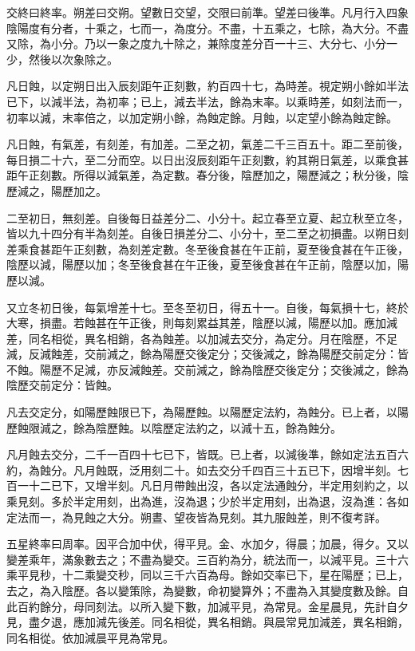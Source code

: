 \begin{pinyinscope}
 交終曰終率。朔差曰交朔。望數日交望，交限曰前準。望差曰後準。凡月行入四象陰陽度有分者，十乘之，七而一，為度分。不盡，十五乘之，七除，為大分。不盡又除，為小分。乃以一象之度九十除之，兼除度差分百一十三、大分七、小分一少，然後以次象除之。



 凡日蝕，以定朔日出入辰刻距午正刻數，約百四十七，為時差。視定朔小餘如半法已下，以減半法，為初率；已上，減去半法，餘為末率。以乘時差，如刻法而一，初率以減，末率倍之，以加定朔小餘，為蝕定餘。月蝕，以定望小餘為蝕定餘。



 凡日蝕，有氣差，有刻差，有加差。二至之初，氣差二千三百五十。距二至前後，每日損二十六，至二分而空。以日出沒辰刻距午正刻數，約其朔日氣差，以乘食甚距午正刻數。所得以減氣差，為定數。春分後，陰歷加之，陽歷減之；秋分後，陰歷減之，陽歷加之。



 二至初日，無刻差。自後每日益差分二、小分十。起立春至立夏、起立秋至立冬，皆以九十四分有半為刻差。自後日損差分二、小分十，至二至之初損盡。以朔日刻差乘食甚距午正刻數，為刻差定數。冬至後食甚在午正前，夏至後食甚在午正後，陰歷以減，陽歷以加；冬至後食甚在午正後，夏至後食甚在午正前，陰歷以加，陽歷以減。



 又立冬初日後，每氣增差十七。至冬至初日，得五十一。自後，每氣損十七，終於大寒，損盡。若蝕甚在午正後，則每刻累益其差，陰歷以減，陽歷以加。應加減差，同名相從，異名相銷，各為蝕差。以加減去交分，為定分。月在陰歷，不足減，反減蝕差，交前減之，餘為陽歷交後定分；交後減之，餘為陽歷交前定分：皆不蝕。陽歷不足減，亦反減蝕差。交前減之，餘為陰歷交後定分；交後減之，餘為陰歷交前定分：皆蝕。



 凡去交定分，如陽歷蝕限已下，為陽歷蝕。以陽歷定法約，為蝕分。已上者，以陽歷蝕限減之，餘為陰歷蝕。以陰歷定法約之，以減十五，餘為蝕分。



 凡月蝕去交分，二千一百四十七已下，皆既。已上者，以減後準，餘如定法五百六約，為蝕分。凡月蝕既，泛用刻二十。如去交分千四百三十五已下，因增半刻。七百一十二已下，又增半刻。凡日月帶蝕出沒，各以定法通蝕分，半定用刻約之，以乘見刻。多於半定用刻，出為進，沒為退；少於半定用刻，出為退，沒為進：各如定法而一，為見蝕之大分。朔晝、望夜皆為見刻。其九服蝕差，則不復考詳。



 五星終率曰周率。因平合加中伏，得平見。金、水加夕，得晨；加晨，得夕。又以變差乘年，滿象數去之；不盡為變交。三百約為分，統法而一，以減平見。三十六乘平見秒，十二乘變交秒，同以三千六百為母。餘如交率已下，星在陽歷；已上，去之，為入陰歷。各以變策除，為變數，命初變算外；不盡為入其變度數及餘。自此百約餘分，母同刻法。以所入變下數，加減平見，為常見。金星晨見，先計自夕見，盡夕退，應加減先後差。同名相從，異名相銷。與晨常見加減差，異名相銷，同名相從。依加減晨平見為常見。




\end{pinyinscope}
